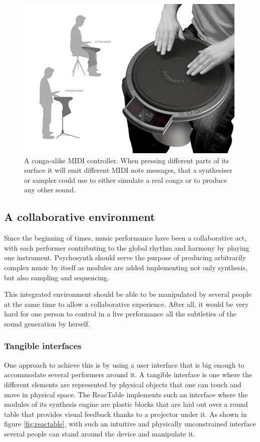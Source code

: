 \begin{figure}[h!]
\centering
\includegraphics[width=.6\textwidth]{pic/lapbeat.jpg}
\caption[A conga-alike MIDI controller.]{A conga-alike MIDI
  controller. When pressing different parts of its surface it will
  emit different MIDI note messages, that a synthesiser or sampler
  could use to either simulate a real conga or to produce any other
  sound.}
\label{fig:midicontrol}
\end{figure}

\subsection{A collaborative environment}

Since the beginning of times, music
performance have been a collaborative act, with each performer
contributing to the global rhythm and harmony by playing one
instrument. Psychosynth should serve the purpose of producing
arbitrarily complex music by itself as modules are added implementing
not only synthesis, but also sampling and sequencing.

This integrated environment should be able to be manipulated by
several people at the same time to allow a collaborative
experience. After all, it would be very hard for one person to control
in a live performance all the subtleties of the sound generation by
herself.

\subsubsection{Tangible interfaces}

One approach to achieve this is by using a
user interface that is big enough to accommodate several performers
around it. A tangible interface is one where the different elements
are represented by physical objects that one can touch and move in
physical space.  The ReacTable implements such an
interface where the modules of its synthesis engine are plastic blocks
that are laid out over a round table that provides visual feedback
thanks to a projector under it. As shown in figure
\ref{fig:reactable}, with such an intuitive and physically
unconstrained interface several people can stand around the device and
manipulate it.

